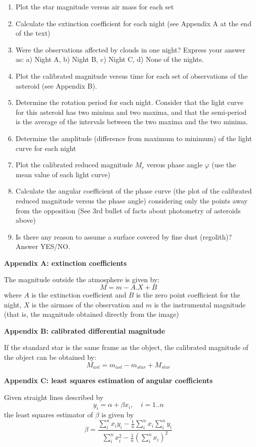 \begin{enumerate}
\item Plot the star magnitude versus air mass for each set
\item Calculate the extinction coefficient for each night (see Appendix A at
  the end of the text)
\item Were the observations affected by clouds in one night? Express your
  answer as: a) Night A, b) Night B, c) Night C, d) None of the nights.
\item Plot the calibrated magnitude versus time for each set of observations
  of the asteroid (see Appendix B).
\item Determine the rotation period for each night. Consider that the light
  curve for this asteroid has two minima and two maxima, and that the
  semi-period is the average of the intervals between the two maxima and the
  two minima.
\item Determine the amplitude (difference from maximum to minimum) of the
  light curve for each night
\item Plot the calibrated reduced magnitude $M_r$ versus phase angle
  $\varphi$ (use the mean value of each light curve)
\item Calculate the angular coefficient of the phase curve (the plot of the
  calibrated reduced magnitude versus the phase angle) considering only the
  points away from the opposition (See 3rd bullet of facts about photometry
  of asteroids above)
\item Is there any reason to assume a surface covered by fine dust (regolith)?
  Answer YES/NO.
\end{enumerate}

\textbf{Appendix A: extinction coefficients}

The magnitude outside the atmosphere is given by:
\[ M = m - A.X + B \]
where $A$ is the extinction coefficient and $B$ is the zero point coefficient
for the night, $X$ is the airmass of the observation and $m$ is the
instrumental magnitude (that is, the magnitude obtained directly from the
image)

\textbf{Appendix B: calibrated differential magnitude}

If the standard star is the same frame as the object, the calibrated
magnitude of the object can be obtained by:
\[ M_{ast} = m_{ast} - m_{star} + M_{star} \]

\textbf{Appendix C: least squares estimation of angular coefficients}

Given straight lines described by
\[ y_i = \alpha + \beta x_i, \quad i = 1..n \]
the least squares estimator of $\beta$ is given by
\[ \beta = \frac{\sum_i^n x_i y_i
     - \frac{1}{n} \sum_i^n x_i \sum_i^n y_i}
   {\sum_i^n x_i^2 - \frac{1}{n} \left( \sum_i^n x_i \right)^2} \]

